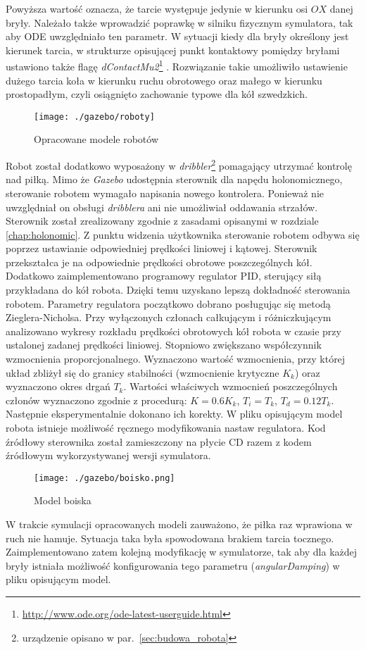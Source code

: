 	Powyższa wartość oznacza, że tarcie występuje jedynie w kierunku osi $OX$ danej bryły.
	Należało także wprowadzić poprawkę w silniku fizycznym symulatora, tak aby ODE uwzględniało ten parametr. W sytuacji kiedy dla bryły określony jest kierunek tarcia,
	w strukturze opisującej punkt kontaktowy pomiędzy bryłami ustawiono także flagę \textit{dContactMu2}\protect\footnote{\url{http://www.ode.org/ode-latest-userguide.html}} .
	Rozwiązanie takie umożliwiło ustawienie dużego tarcia koła  w kierunku ruchu obrotowego oraz małego
	w kierunku prostopadłym, czyli osiągnięto zachowanie typowe dla kół szwedzkich.
	\begin{figure}[H]
	\centering
	\texttt{[image: ./gazebo/roboty]}
	\caption{Opracowane modele robotów  \label{fig:robots}}
	\end{figure}
	Robot został dodatkowo wyposażony w \textit{dribbler}\protect\footnote{urządzenie opisano w par.~\ref{sec:budowa_robota}} pomagający utrzymać kontrolę nad piłką.
	Mimo że \textit{Gazebo} udostępnia sterownik dla napędu holonomicznego, sterowanie robotem wymagało napisania nowego kontrolera. Ponieważ nie uwzględniał on obsługi
	\textit{dribblera} ani nie umożliwiał oddawania strzałów. Sterownik został zrealizowany zgodnie z zasadami opisanymi w rozdziale \ref{chap:holonomic}. Z punktu widzenia użytkownika
	sterowanie robotem odbywa się poprzez ustawianie odpowiedniej prędkości liniowej i kątowej. Sterownik przekształca je na odpowiednie prędkości obrotowe poszczególnych kół.
	Dodatkowo zaimplementowano programowy regulator PID, sterujący siłą przykładana do kół robota. Dzięki temu uzyskano lepszą dokładność sterowania robotem.
	Parametry regulatora początkowo dobrano posługując się metodą Zieglera-Nicholsa. Przy wyłączonych członach całkującym i różniczkującym analizowano wykresy rozkładu
	prędkości obrotowych kół robota w czasie przy ustalonej zadanej prędkości liniowej. Stopniowo zwiększano współczynnik wzmocnienia proporcjonalnego. Wyznaczono wartość wzmocnienia,
	przy której układ zbliżył się do granicy stabilności (wzmocnienie krytyczne $K_k$) oraz wyznaczono okres drgań $T_k$. 
	Wartości właściwych wzmocnień poszczególnych  członów wyznaczono zgodnie z procedurą: $K=0.6K_k$, $T_i=T_k$, $T_d=0.12T_k$. Następnie eksperymentalnie dokonano ich korekty.
	W pliku opisującym model robota istnieje możliwość ręcznego modyfikowania nastaw regulatora.
	Kod źródłowy sterownika został zamieszczony na płycie CD razem z kodem źródłowym wykorzystywanej wersji symulatora.	
	\begin{figure}[H]
	\centering
	\texttt{[image: ./gazebo/boisko.png]}
	\caption{Model boiska}
	\end{figure}
	W trakcie symulacji opracowanych modeli zauważono, że piłka raz wprawiona w ruch nie hamuje. Sytuacja taka była spowodowana brakiem tarcia tocznego. Zaimplementowano zatem kolejną modyfikację w 
	symulatorze, tak aby dla każdej bryły istniała możliwość konfigurowania tego parametru (\textit{angularDamping}) w pliku opisującym model.

